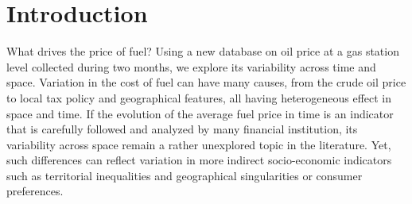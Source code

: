\documentclass[3p,times,procedia]{elsarticle}
\begin{document}




\section{Introduction}
\label{main}

What drives the price of fuel? Using a new database on oil price at a gas station level collected during two months, we explore its variability across time and space. Variation in the cost of fuel can have many causes, from the crude oil price to local tax policy and geographical features, all having heterogeneous effect in space and time. If the evolution of the average fuel price in time is an indicator that is carefully followed and analyzed by many financial institution, its variability across space remain a rather unexplored topic in the literature. Yet, such differences can reflect variation in more indirect socio-economic indicators such as territorial inequalities and geographical singularities or consumer preferences.

\end{document}
